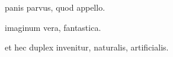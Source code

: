 \documentclass{book}
\begin{document}
\begin{ledgroup}
\beginnumbering
\pstart
panis parvus, quod  appello. 
\pend

\pstart
imaginum  vera,  fantastica.
\pend

\pstart
et hec duplex invenitur,  naturalis,  artificialis.
\pend
\endnumbering
\end{ledgroup}
\end{document}
